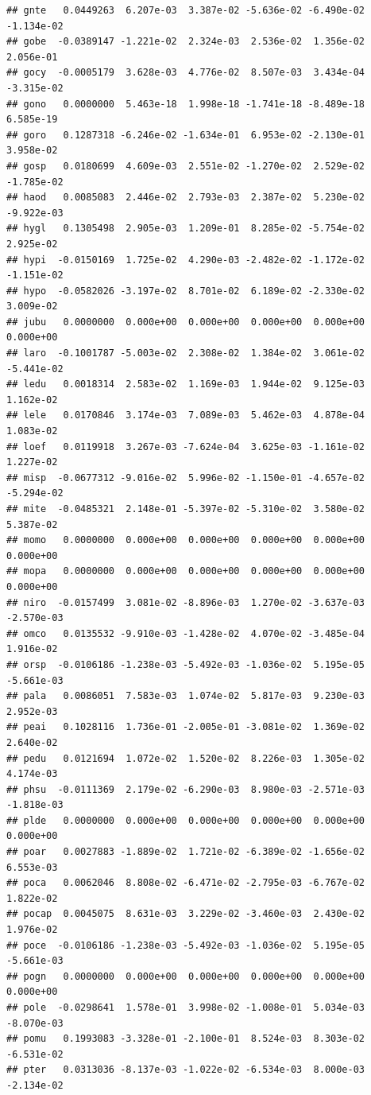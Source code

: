 \documentclass[
]{article}
\begin{document}
\begin{verbatim}
## gnte   0.0449263  6.207e-03  3.387e-02 -5.636e-02 -6.490e-02 -1.134e-02
## gobe  -0.0389147 -1.221e-02  2.324e-03  2.536e-02  1.356e-02  2.056e-01
## gocy  -0.0005179  3.628e-03  4.776e-02  8.507e-03  3.434e-04 -3.315e-02
## gono   0.0000000  5.463e-18  1.998e-18 -1.741e-18 -8.489e-18  6.585e-19
## goro   0.1287318 -6.246e-02 -1.634e-01  6.953e-02 -2.130e-01  3.958e-02
## gosp   0.0180699  4.609e-03  2.551e-02 -1.270e-02  2.529e-02 -1.785e-02
## haod   0.0085083  2.446e-02  2.793e-03  2.387e-02  5.230e-02 -9.922e-03
## hygl   0.1305498  2.905e-03  1.209e-01  8.285e-02 -5.754e-02  2.925e-02
## hypi  -0.0150169  1.725e-02  4.290e-03 -2.482e-02 -1.172e-02 -1.151e-02
## hypo  -0.0582026 -3.197e-02  8.701e-02  6.189e-02 -2.330e-02  3.009e-02
## jubu   0.0000000  0.000e+00  0.000e+00  0.000e+00  0.000e+00  0.000e+00
## laro  -0.1001787 -5.003e-02  2.308e-02  1.384e-02  3.061e-02 -5.441e-02
## ledu   0.0018314  2.583e-02  1.169e-03  1.944e-02  9.125e-03  1.162e-02
## lele   0.0170846  3.174e-03  7.089e-03  5.462e-03  4.878e-04  1.083e-02
## loef   0.0119918  3.267e-03 -7.624e-04  3.625e-03 -1.161e-02  1.227e-02
## misp  -0.0677312 -9.016e-02  5.996e-02 -1.150e-01 -4.657e-02 -5.294e-02
## mite  -0.0485321  2.148e-01 -5.397e-02 -5.310e-02  3.580e-02  5.387e-02
## momo   0.0000000  0.000e+00  0.000e+00  0.000e+00  0.000e+00  0.000e+00
## mopa   0.0000000  0.000e+00  0.000e+00  0.000e+00  0.000e+00  0.000e+00
## niro  -0.0157499  3.081e-02 -8.896e-03  1.270e-02 -3.637e-03 -2.570e-03
## omco   0.0135532 -9.910e-03 -1.428e-02  4.070e-02 -3.485e-04  1.916e-02
## orsp  -0.0106186 -1.238e-03 -5.492e-03 -1.036e-02  5.195e-05 -5.661e-03
## pala   0.0086051  7.583e-03  1.074e-02  5.817e-03  9.230e-03  2.952e-03
## peai   0.1028116  1.736e-01 -2.005e-01 -3.081e-02  1.369e-02  2.640e-02
## pedu   0.0121694  1.072e-02  1.520e-02  8.226e-03  1.305e-02  4.174e-03
## phsu  -0.0111369  2.179e-02 -6.290e-03  8.980e-03 -2.571e-03 -1.818e-03
## plde   0.0000000  0.000e+00  0.000e+00  0.000e+00  0.000e+00  0.000e+00
## poar   0.0027883 -1.889e-02  1.721e-02 -6.389e-02 -1.656e-02  6.553e-03
## poca   0.0062046  8.808e-02 -6.471e-02 -2.795e-03 -6.767e-02  1.822e-02
## pocap  0.0045075  8.631e-03  3.229e-02 -3.460e-03  2.430e-02  1.976e-02
## poce  -0.0106186 -1.238e-03 -5.492e-03 -1.036e-02  5.195e-05 -5.661e-03
## pogn   0.0000000  0.000e+00  0.000e+00  0.000e+00  0.000e+00  0.000e+00
## pole  -0.0298641  1.578e-01  3.998e-02 -1.008e-01  5.034e-03 -8.070e-03
## pomu   0.1993083 -3.328e-01 -2.100e-01  8.524e-03  8.303e-02 -6.531e-02
## pter   0.0313036 -8.137e-03 -1.022e-02 -6.534e-03  8.000e-03 -2.134e-02

\end{verbatim}
\end{document}
